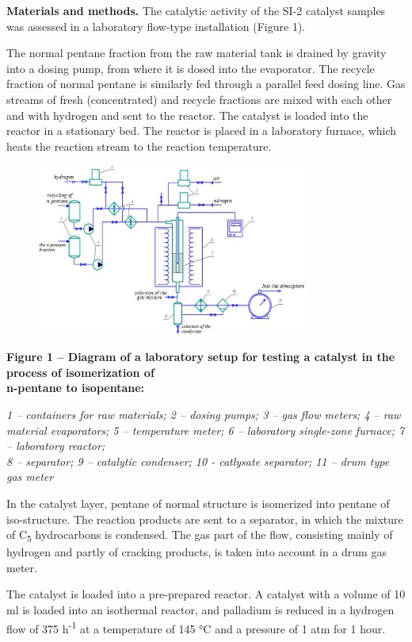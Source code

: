 {\bfseries Materials and methods.} The catalytic activity of the SI-2
catalyst samples was assessed in a laboratory flow-type installation
(Figure 1).

The normal pentane fraction from the raw material tank is drained by
gravity into a dosing pump, from where it is dosed into the evaporator.
The recycle fraction of normal pentane is similarly fed through a
parallel feed dosing line. Gas streams of fresh (concentrated) and
recycle fractions are mixed with each other and with hydrogen and sent
to the reactor. The catalyst is loaded into the reactor in a stationary
bed. The reactor is placed in a laboratory furnace, which heats the
reaction stream to the reaction temperature.

\begin{figure}[H]
	\centering
	\includegraphics[width=0.8\textwidth]{assets/1053}
	\caption*{}
\end{figure} {\bfseries Figure 1 -- Diagram of a
laboratory setup for testing a catalyst in the process of isomerization
of\\
n-pentane to isopentane:}

\emph{1 -- containers for raw materials; 2 -- dosing pumps; 3 -- gas
flow meters; 4 -- raw material evaporators; 5 -- temperature meter; 6 --
laboratory single-zone furnace; 7 -- laboratory reactor;\\
8 -- separator; 9 -- catalytic condenser; 10 - catlysate separator; 11
-- drum type gas meter}

In the catalyst layer, pentane of normal structure is isomerized into
pentane of iso-structure. The reaction products are sent to a separator,
in which the mixture of C\textsubscript{5} hydrocarbons is condensed.
The gas part of the flow, consisting mainly of hydrogen and partly of
cracking products, is taken into account in a drum gas meter.

The catalyst is loaded into a pre-prepared reactor. A catalyst with a
volume of 10 ml is loaded into an isothermal reactor, and palladium is
reduced in a hydrogen flow of 375 h\textsuperscript{-1} at a temperature
of 145 °C and a pressure of 1 atm for 1 hour.

